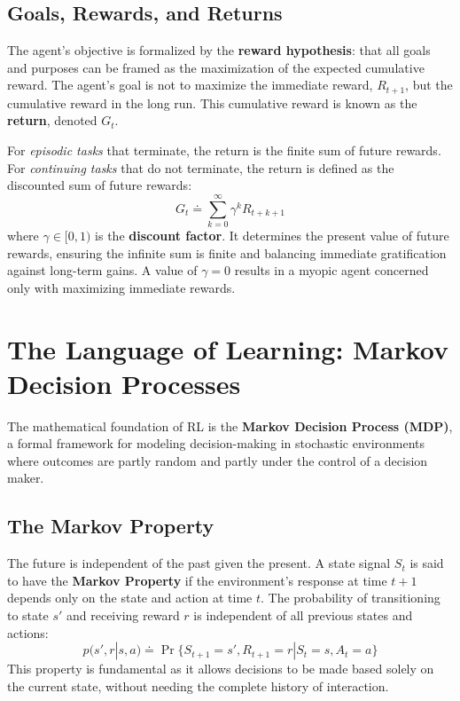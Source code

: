 \subsection{Goals, Rewards, and Returns}
The agent's objective is formalized by the \textbf{reward hypothesis}: that all goals and purposes can be framed as the maximization of the expected cumulative reward. The agent's goal is not to maximize the immediate reward, $R_{t+1}$, but the cumulative reward in the long run. This cumulative reward is known as the \textbf{return}, denoted $G_t$.

For \textit{episodic tasks} that terminate, the return is the finite sum of future rewards. For \textit{continuing tasks} that do not terminate, the return is defined as the discounted sum of future rewards:
\begin{equation}
    G_t \doteq \sum_{k=0}^{\infty} \gamma^k R_{t+k+1}
\end{equation}
where $\gamma \in [0, 1)$ is the \textbf{discount factor}. It determines the present value of future rewards, ensuring the infinite sum is finite and balancing immediate gratification against long-term gains. A value of $\gamma=0$ results in a myopic agent concerned only with maximizing immediate rewards.

\section{The Language of Learning: Markov Decision Processes}
The mathematical foundation of RL is the \textbf{Markov Decision Process (MDP)}, a formal framework for modeling decision-making in stochastic environments where outcomes are partly random and partly under the control of a decision maker.

\subsection{The Markov Property}
The future is independent of the past given the present. A state signal $S_t$ is said to have the \textbf{Markov Property} if the environment's response at time $t+1$ depends only on the state and action at time $t$. The probability of transitioning to state $s'$ and receiving reward $r$ is independent of all previous states and actions:
\begin{equation}
    p(s', r | s, a) \doteq \Pr\{S_{t+1}=s', R_{t+1}=r | S_t=s, A_t=a\}
\end{equation}
This property is fundamental as it allows decisions to be made based solely on the current state, without needing the complete history of interaction.

